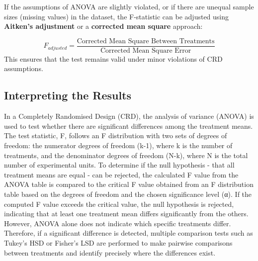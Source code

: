\documentclass[
  letterpaper,
  DIV=11,
  numbers=noendperiod]{scrartcl}
\begin{document}
\begin{tcolorbox}[enhanced jigsaw, titlerule=0mm, title=\textcolor{quarto-callout-tip-color}{\faLightbulb}\hspace{0.5em}{Adjustment for Unequal Variances or Missing Values}, bottomrule=.15mm, colback=white, opacityback=0, rightrule=.15mm, colframe=quarto-callout-tip-color-frame, toprule=.15mm, toptitle=1mm, leftrule=.75mm, left=2mm, arc=.35mm, breakable, coltitle=black, bottomtitle=1mm, colbacktitle=quarto-callout-tip-color!10!white, opacitybacktitle=0.6]

If the assumptions of ANOVA are slightly violated, or if there are
unequal sample sizes (missing values) in the dataset, the F-statistic
can be adjusted using \textbf{Aitken's adjustment} or a
\textbf{corrected mean square} approach:

\[
F_{adjusted} = \frac{\text{Corrected Mean Square Between Treatments}}{\text{Corrected Mean Square Error}}
\] This ensures that the test remains valid under minor violations of
CRD assumptions.

\end{tcolorbox}

\hypertarget{sec-results}{%
\subsection{Interpreting the Results}\label{sec-results}}

In a Completely Randomised Design (CRD), the analysis of variance
(ANOVA) is used to test whether there are significant differences among
the treatment means. The test statistic, F, follows an F distribution
with two sets of degrees of freedom: the numerator degrees of freedom
(k-1), where k is the number of treatments, and the denominator degrees
of freedom (N-k), where N is the total number of experimental units. To
determine if the null hypothesis - that all treatment means are equal -
can be rejected, the calculated F value from the ANOVA table is compared
to the critical F value obtained from an F distribution table based on
the degrees of freedom and the chosen significance level (α). If the
computed F value exceeds the critical value, the null hypothesis is
rejected, indicating that at least one treatment mean differs
significantly from the others. However, ANOVA alone does not indicate
which specific treatments differ. Therefore, if a significant difference
is detected, multiple comparison tests such as Tukey's HSD or Fisher's
LSD are performed to make pairwise comparisons between treatments and
identify precisely where the differences exist.
\end{document}
